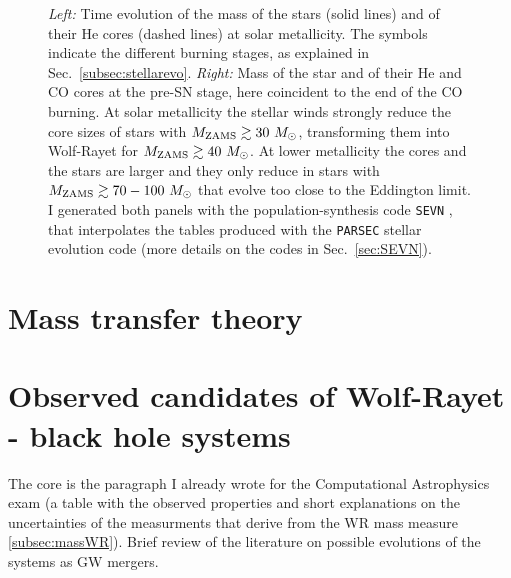 \documentclass[a4paper,titlepage]{book}     	%
\newcommand{\sun}{\ensuremath{_\odot}}
\newcommand{\mzams}{M_\textup{ZAMS}}
\newcommand{\msun}{\ensuremath{M\sun}}
\begin{document}
\begin{figure}[h!]
\begin{minipage}{.49\textwidth}
	\end{minipage}
	\caption{\emph{Left:} Time evolution of the mass of the stars (solid lines) and of their He cores (dashed lines) at solar metallicity. The symbols indicate the different burning stages, as explained in Sec.\ \ref{subsec:stellarevo}. \emph{Right:} Mass of the star and of their He and CO cores at the pre-SN stage, here coincident to the end of the CO burning. At solar metallicity the stellar winds strongly reduce the core sizes of stars with $\mzams \gtrsim 30 ~\msun$, transforming them into Wolf-Rayet for $\mzams \gtrsim 40 ~\msun$. At lower metallicity the cores and the stars are larger and they only reduce in stars with $\mzams \gtrsim 70-100 ~\msun$ that evolve too close to the Eddington limit. I generated both panels with the population-synthesis code \texttt{SEVN} \cite{spera2019_mergingBBH}, that interpolates the tables produced with the \texttt{PARSEC} stellar evolution code \cite{parsec2015_chen} (more details on the codes in Sec.\ \ref{sec:SEVN}).}\label{fig:masslostWR}
\end{figure}




\section{Mass transfer theory}\label{subsec:masstransfer}






\section{Observed candidates of Wolf-Rayet - black hole systems}\label{sec:WRBHobserved}
The core is the paragraph I already wrote for the Computational Astrophysics exam (a table with the observed properties and short explanations on the uncertainties of the measurments that derive from the WR mass measure \ref{subsec:massWR}). Brief review of the literature on possible evolutions of the systems as GW mergers.\\
\end{document}
